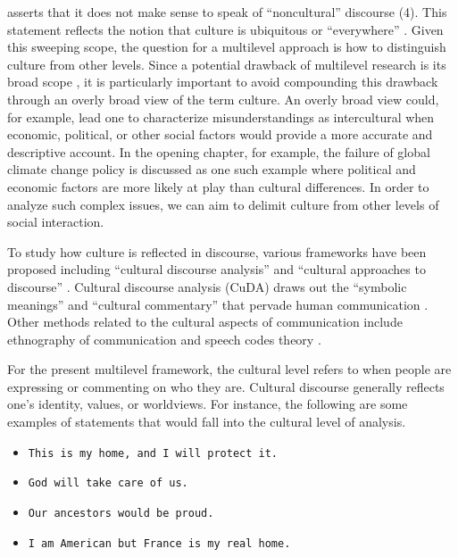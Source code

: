 \cite*{Blommaert2005a} asserts that it does not make sense to speak of ``noncultural'' discourse (4). This statement reflects the notion that culture is ubiquitous \citep[15]{Neuliep2018a} or ``everywhere'' \citep{Hannerz1993a}. Given this sweeping scope, the question for a multilevel approach is how to distinguish culture from other levels. Since a potential drawback of multilevel research is its broad scope \citep{KleinK.J.TosiH.&Cannella1999a}, it is particularly important to avoid compounding this drawback through an overly broad view of the term culture. An overly broad view could, for example, lead one to characterize misunderstandings as intercultural when economic, political, or other social factors would provide a more accurate and descriptive account. In the opening chapter, for example, the failure of global climate change policy is discussed as one such example where political and economic factors are more likely at play than cultural differences. In order to analyze such complex issues, we can aim to delimit culture from other levels of social interaction.

To study how culture is reflected in discourse, various frameworks have been proposed including ``cultural discourse analysis'' \citep{Carbaugh2007a} and ``cultural approaches to discourse'' \citep{Shi-xu2005a}. Cultural discourse analysis (CuDA) draws out the ``symbolic meanings'' and ``cultural commentary'' that pervade human communication \citep[168]{Carbaugh2007a}. Other methods related to the cultural aspects of communication include ethnography of communication \citep{Hymes1972a} and speech codes theory \citep{Philipsen1997a}.

For the present multilevel framework, the cultural level refers to when people are expressing or commenting on who they are. Cultural discourse generally reflects one's identity, values, or worldviews. For instance, the following are some examples of statements that would fall into the cultural level of analysis.

\begin{footnotesize}
\begin{itemize}
    \item[-] \texttt{This is my home, and I will protect it.}
    \item[-] \texttt{God will take care of us.}
    \item[-] \texttt{Our ancestors would be proud.}
    \item[-] \texttt{I am American but France is my real home.}
\end{itemize}
\end{footnotesize}

